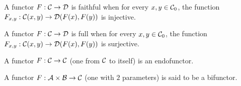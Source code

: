 \begin{definition}
  A functor $F:\mathcal{C}\to \mathcal{D}$ is faithful when for every $x,y\in \mathcal{C}_0$, the function
  $F_{x, y}: \mathcal{C}(x, y) \to \mathcal{D}(F(x), F(y))$ is injective.
  \parencite{awodey:category_theory}
\end{definition}

\begin{definition}
  A functor $F:\mathcal{C}\to \mathcal{D}$ is full when for every $x,y\in \mathcal{C}_0$, the function
  $F_{x, y}: \mathcal{C}(x, y) \to \mathcal{D}(F(x), F(y))$ is surjective.
  \parencite{adamek_herrlich_strecker:joy_cats}
\end{definition}

\begin{definition}
  A functor $F:\mathcal{C}\to \mathcal{C}$ (one from $\mathcal{C}$ to itself) is an endofunctor.
  \parencite{adamek_herrlich_strecker:joy_cats}
\end{definition}

\begin{definition}
  A functor $F:\mathcal{A}\times \mathcal{B} \to \mathcal{C}$ (one with $2$ parameters) is said to be a
  bifunctor.
  \parencite{lane:working_mathematician}
\end{definition}
